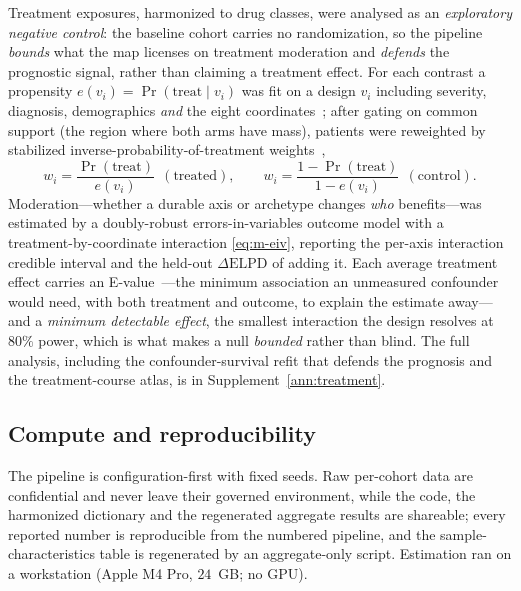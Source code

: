 Treatment exposures, harmonized to drug classes, were analysed as an \emph{exploratory
negative control}: the baseline cohort carries no randomization, so the pipeline \emph{bounds}
what the map licenses on treatment moderation and \emph{defends} the prognostic signal, rather
than claiming a treatment effect. For each contrast a propensity
$e(v_i)=\Pr(\text{treat}\mid v_i)$ was fit on a design $v_i$ including severity, diagnosis,
demographics \emph{and} the eight coordinates~\citep{rosenbaum1983propensity}; after gating on
common support (the region where both arms have mass), patients were reweighted by stabilized
inverse-probability-of-treatment weights~\citep{austin2011iptw},
\begin{equation}
  w_i=\frac{\Pr(\text{treat})}{e(v_i)}\ \ (\text{treated}),\qquad
  w_i=\frac{1-\Pr(\text{treat})}{1-e(v_i)}\ \ (\text{control}) .
  \label{eq:m-iptw}
\end{equation}
Moderation---whether a durable axis or archetype changes \emph{who} benefits---was estimated
by a doubly-robust errors-in-variables outcome model with a treatment-by-coordinate
interaction \eqref{eq:m-eiv}, reporting the per-axis interaction credible interval and the
held-out $\Delta\mathrm{ELPD}$ of adding it. Each average treatment effect carries an
E-value~\citep{vanderweele2017evalue}---the minimum association an unmeasured confounder would
need, with both treatment and outcome, to explain the estimate away---and a
\emph{minimum detectable effect}, the smallest interaction the design resolves at $80\%$ power,
which is what makes a null \emph{bounded} rather than blind. The full analysis, including the
confounder-survival refit that defends the prognosis and the treatment-course atlas, is in
Supplement~\ref{ann:treatment}.

\subsection{Compute and reproducibility}

The pipeline is configuration-first with fixed seeds. Raw per-cohort data are
confidential and never leave their governed environment, while the code, the harmonized
dictionary and the regenerated aggregate results are shareable; every reported number is
reproducible from the numbered pipeline, and the sample-characteristics table is
regenerated by an aggregate-only script. Estimation ran on a workstation (Apple M4 Pro,
$24$~GB; no GPU).

